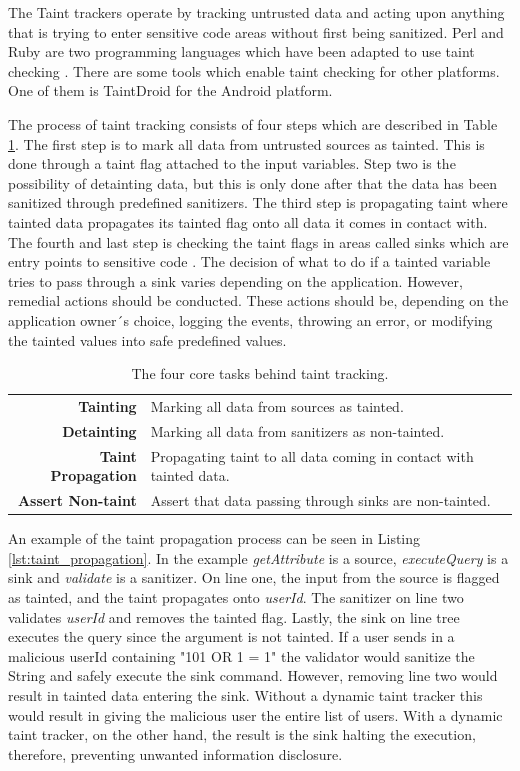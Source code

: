 The Taint trackers operate by tracking untrusted data and acting upon anything that is trying to enter sensitive code areas without first being sanitized. Perl and Ruby are two programming languages which have been adapted to use taint checking \parencite{perl, ruby}. There are some tools which enable taint checking for other platforms. One of them is TaintDroid \parencite{Ma2010} for the Android platform.

The process of taint tracking consists of four steps which are described in Table \ref{table:taintTracking}. The first step is to mark all data from untrusted sources as tainted. This is done through a taint flag attached to the input variables. Step two is the possibility of detainting data, but this is only done after that the data has been sanitized through predefined sanitizers. The third step is propagating taint where tainted data propagates its tainted flag onto all data it comes in contact with. The fourth and last step is checking the taint flags in areas called sinks which are entry points to sensitive code \parencite{Pan2015, Venkataramani2008}. The decision of what to do if a tainted variable tries to pass through a sink varies depending on the application. However, remedial actions should be conducted. These actions should be, depending on the application owner´s choice, logging the events, throwing an error, or modifying the tainted values into safe predefined values. 

\begin{table}[H]
  \centering
  \caption{The four core tasks behind taint tracking.}
  \label{table:taintTracking}
  \begin{tabular}{rp{8.5cm}}
    \textbf{Tainting}           & Marking all data from sources as tainted.                          \\
    \textbf{Detainting}         & Marking all data from sanitizers as non-tainted.                   \\
    \textbf{Taint Propagation}     & Propagating taint to all data coming in contact with tainted data. \\
    \textbf{Assert Non-taint} & Assert that data passing through sinks are non-tainted.           
  \end{tabular}
\end{table}

An example of the taint propagation process can be seen in Listing \ref{lst:taint_propagation}. In the example \textit{getAttribute} is a source, \textit{executeQuery} is a sink and \textit{validate} is a sanitizer. On line one, the input from the source is flagged as tainted, and the taint propagates onto \textit{userId}. The sanitizer on line two validates \textit{userId} and removes the tainted flag. Lastly, the sink on line tree executes the query since the argument is not tainted. If a user sends in a malicious userId containing "101 OR 1 = 1" the validator would sanitize the String and safely execute the sink command. However, removing line two would result in tainted data entering the sink. Without a dynamic taint tracker this would result in giving the malicious user the entire list of users. With a dynamic taint tracker, on the other hand, the result is the sink halting the execution, therefore, preventing unwanted information disclosure.

